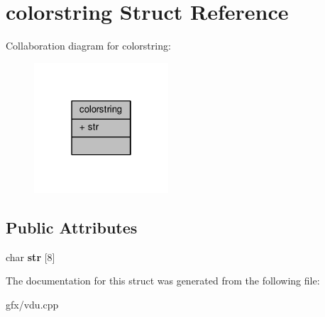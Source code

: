 \hypertarget{structcolorstring}{}\section{colorstring Struct Reference}
\label{structcolorstring}


Collaboration diagram for colorstring\+:
\nopagebreak
\begin{figure}[H]
\begin{center}
\leavevmode
\includegraphics[width=142pt]{d7/d70/structcolorstring__coll__graph}
\end{center}
\end{figure}
\subsection*{Public Attributes}
\begin{DoxyCompactItemize}
\item 
char {\bfseries str} \mbox{[}8\mbox{]}\hypertarget{structcolorstring_ab599cf58129b39ef5d82cae5b5246967}{}\label{structcolorstring_ab599cf58129b39ef5d82cae5b5246967}

\end{DoxyCompactItemize}


The documentation for this struct was generated from the following file\+:\begin{DoxyCompactItemize}
\item 
gfx/vdu.\+cpp\end{DoxyCompactItemize}
